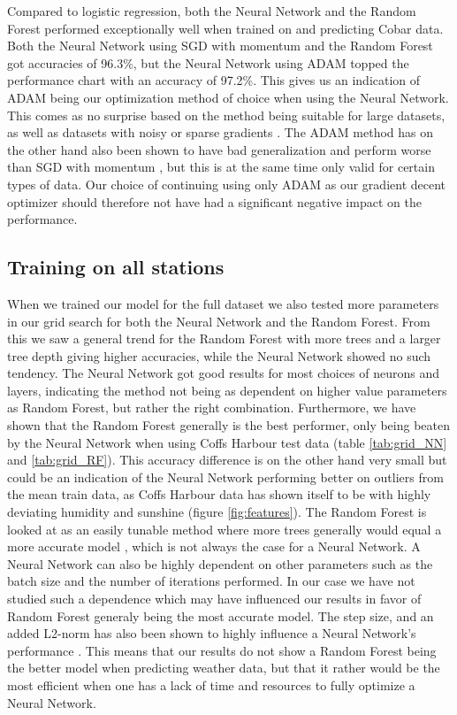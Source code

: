 \documentclass[11pt]{article}
\begin{document}
Compared to logistic regression, both the Neural Network and the Random Forest performed exceptionally well when trained on and predicting Cobar data. Both the Neural Network using SGD with momentum and the Random Forest got accuracies of 96.3\%, but the Neural Network using ADAM topped the performance chart with an accuracy of 97.2\%. This gives us an indication of ADAM being our optimization method of choice when using the Neural Network. This comes as no surprise based on the method being suitable for large datasets, as well as datasets with noisy or sparse gradients \cite{kingma2014adam}. The ADAM method has on the other hand also been shown to have bad generalization and perform worse than SGD with momentum \cite{SGD}, but this is at the same time only valid for certain types of data. Our choice of continuing using only ADAM as our gradient decent optimizer should therefore not have had a significant negative impact on the performance.

\subsection{Training on all stations} %
\label{sub:Training on all stations}

When we trained our model for the full dataset we also tested more parameters in our grid search for both the Neural Network and the Random Forest. From this we saw a general trend for the Random Forest with more trees and a larger tree depth giving higher accuracies, while the Neural Network showed no such tendency. The Neural Network got good results for most choices of neurons and layers, indicating the method not being as dependent on higher value parameters as Random Forest, but rather the right combination. Furthermore, we have shown that the Random Forest generally is the best performer, only being beaten by the Neural Network when using Coffs Harbour test data (table \ref{tab:grid_NN} and \ref{tab:grid_RF}). This accuracy difference is on the other hand very small but could be an indication of the Neural Network performing better on outliers from the mean train data, as Coffs Harbour data has shown itself to be with highly deviating humidity and sunshine (figure \ref{fig:features}). The Random Forest is looked at as an easily tunable method where more trees generally would equal a more accurate model \cite{probst2017tune}, which is not always the case for a Neural Network. A Neural Network can also be highly dependent on other parameters such as the batch size and the number of iterations performed. In our case we have not studied such a dependence which may have influenced our results in favor of Random Forest generaly being the most accurate model. The step size, and an added L2-norm has also been shown to highly influence a Neural Network's performance \cite{project2}. This means that our results do not show a Random Forest being the better model when predicting weather data, but that it rather would be the most efficient when one has a lack of time and resources to fully optimize a Neural Network.
\end{document}
